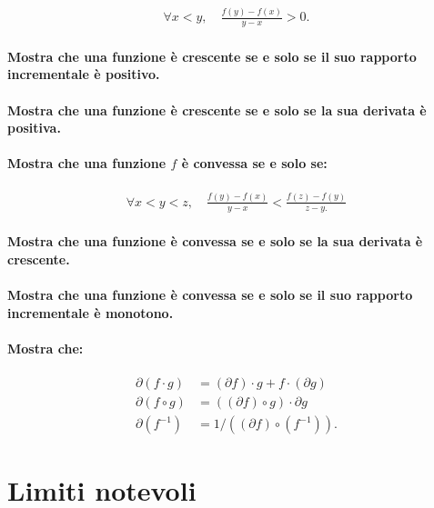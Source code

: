 \documentclass{article}
\begin{document}
\begin{align*}
\forall x < y, \quad \frac{f(y) - f(x)}{y - x} > 0.
\end{align*}

\paragraph{Mostra che una funzione è crescente se e solo se il suo rapporto incrementale è positivo.}

\paragraph{Mostra che una funzione è crescente se e solo se la sua derivata è positiva.}

\paragraph{Mostra che una funzione $f$ è convessa se e solo se:}

\begin{align*}
\forall x < y < z, \quad \frac{f(y) - f(x)}{y - x} < \frac{f(z) - f(y)}{z - y.}
\end{align*}

\paragraph{Mostra che una funzione è convessa se e solo se la sua derivata è crescente.}

\paragraph{Mostra che una funzione è convessa se e solo se il suo rapporto incrementale è monotono.}

\paragraph{Mostra che:}

\begin{align*}
\partial (f \cdot g) &= (\partial f) \cdot g + f \cdot (\partial g)\\
\partial (f \circ g) &= ((\partial f) \circ g) \cdot \partial g\\
\partial (f^{- 1}) &= 1 / ((\partial f) \circ (f^{- 1})).
\end{align*}

\newpage
\section*{Limiti notevoli}
\end{document}

